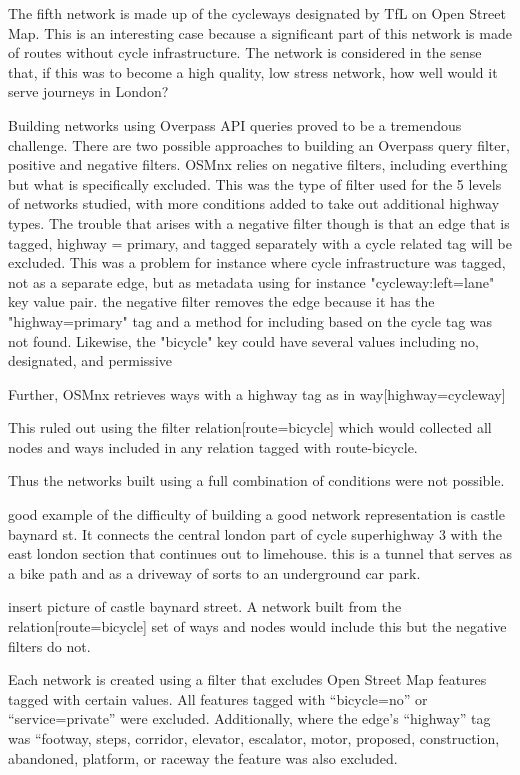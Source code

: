 \documentclass[11pt]{article} %
\begin{document}
The fifth network is made up of the cycleways designated by TfL on Open Street Map. This is an interesting case because a significant part of this network is made of routes without cycle infrastructure. The network is considered in the sense that, if this was to become a high quality, low stress network, how well would it serve journeys in London? 


Building networks using Overpass API queries proved to be a tremendous challenge. There are two possible approaches to building an Overpass query filter, positive and negative filters. OSMnx relies on negative filters, including everthing but what is specifically excluded. This was the type of filter used for the 5 levels of networks studied, with more conditions added to take out additional highway types. The trouble that arises with a negative filter though is that an edge that is tagged, highway = primary, and tagged separately with a cycle related tag will be excluded. This was a problem for instance where cycle infrastructure was tagged, not as a separate edge, but as metadata using for instance "cycleway:left=lane" key value pair. the negative filter removes the edge because it has the "highway=primary" tag and a method for including based on the cycle tag was not found. Likewise, the "bicycle" key could have several values including no, designated, and permissive

Further, OSMnx retrieves ways with a highway tag as in way[highway=cycleway]

This ruled out using the filter relation[route=bicycle]  which would collected all nodes and ways included in any relation tagged with route-bicycle. 

Thus the networks built using a  full combination of conditions were not possible. 

good example of the difficulty of building a good network representation is castle baynard st. It connects the central london part of cycle superhighway 3 with the east london section that continues out to limehouse. this is a tunnel that serves as a bike path and as a driveway of sorts to an underground car park. 

insert picture of castle baynard street. A network built from the relation[route=bicycle] set of ways and nodes would include this but the negative filters do not. 



Each network is created using a filter that excludes Open Street Map features tagged with certain values. All features tagged with ``bicycle=no'' or ``service=private'' were excluded. Additionally, where the edge's ``highway'' tag was ``footway, steps, corridor, elevator, escalator, motor, proposed, construction, abandoned, platform, or raceway the feature was also excluded. 
\end{document}
